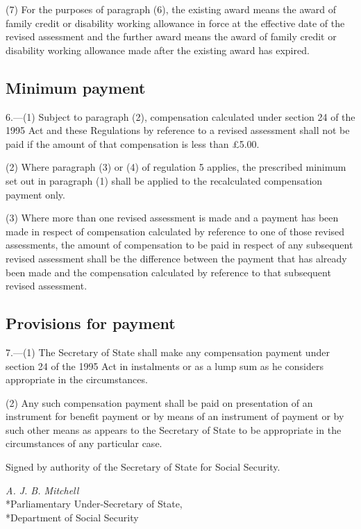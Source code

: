 \documentclass[a4paper]{article}
\begin{document}
(7) For the purposes of paragraph (6), the existing award means the award of family credit or disability working allowance in force at the effective date of the revised assessment and the further award means the award of family credit or disability working allowance made after the existing award has expired.

\subsection[6. Minimum payment]{Minimum payment}

6.—(1) Subject to paragraph (2), compensation calculated under section 24 of the 1995 Act and these Regulations by reference to a revised assessment shall not be paid if the amount of that compensation is less than £5.00.

(2) Where paragraph (3) or (4) of regulation 5 applies, the prescribed minimum set out in paragraph (1) shall be applied to the recalculated compensation payment only.

(3) Where more than one revised assessment is made and a payment has been made in respect of compensation calculated by reference to one of those revised assessments, the amount of compensation to be paid in respect of any subsequent revised assessment shall be the difference between the payment that has already been made and the compensation calculated by reference to that subsequent revised assessment.

\subsection[7. Provisions for payment]{Provisions for payment}

7.—(1) The Secretary of State shall make any compensation payment under section 24 of the 1995 Act in instalments or as a lump sum as he considers appropriate in the circumstances.

(2) Any such compensation payment shall be paid on presentation of an instrument for benefit payment or by means of an instrument of payment or by such other means as appears to the Secretary of State to be appropriate in the circumstances of any particular case.

\bigskip

Signed by authority of the Secretary of State for Social Security.

{\raggedleft
\emph{A. J. B. Mitchell}\\*Parliamentary Under-Secretary of State,\\*Department of Social Security

}
\end{document}
